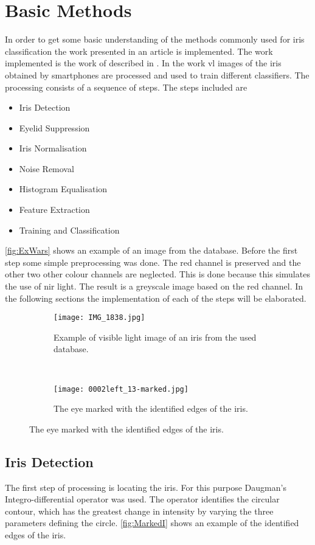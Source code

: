 \section{Basic Methods}
\label{BasicM}
In order to get some basic understanding of the methods commonly used for iris classification the work presented in an article is implemented. The work implemented is the work of \cite{Khan2017a} described in \citep{Khan2017a}. In the work \gls{vl} images of the iris obtained by smartphones are processed and used to train different classifiers. The processing consists of a sequence of steps. The steps included are

\begin{itemize}
\item Iris Detection
\item Eyelid Suppression
\item Iris Normalisation
\item Noise Removal
\item Histogram Equalisation 
\item Feature Extraction
\item Training and Classification
\end{itemize}
\autoref{fig:ExWars} shows an example of an image from the database. Before the first step some simple preprocessing was done. The red channel is preserved and the other two other colour channels are neglected. This is done because this simulates the use of \gls{nir} light. The result is a greyscale image based on the red channel. In the following sections the implementation of each of the steps will be elaborated. 

\begin{figure}[h]
\centering
\begin{subfigure}{.47\textwidth}
\centering
\texttt{[image: IMG\_1838.jpg]}
\caption{Example of visible light image of an iris from the used database.}
\label{fig:ExWars}
\end{subfigure}
~
\begin{subfigure}{.47\textwidth}
\centering
\texttt{[image: 0002left\_13-marked.jpg]}
\caption{The eye marked with the identified edges of the iris.}
\label{fig:MarkedI}
\end{subfigure}
\end{figure}



\subsection{Iris Detection}
The first step of processing is locating the iris. For this purpose Daugman's Integro-differential operator was used. The operator identifies the circular contour, which has the greatest change in intensity by varying the three parameters defining the circle. \autoref{fig:MarkedI} shows an example of the identified edges of the iris.




